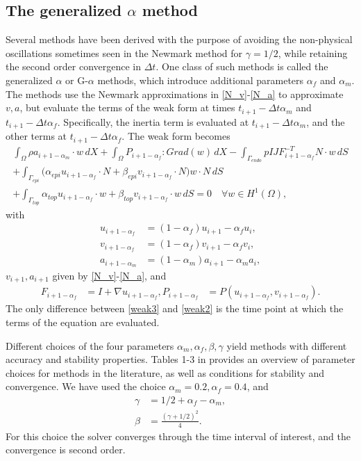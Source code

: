 \documentclass[a4paper,10pt]{article}
\begin{document}
\subsection{The generalized $\alpha$ method}
Several methods have been derived with the purpose of avoiding the non-physical
oscillations sometimes seen in the Newmark method for $\gamma =1/2$, while retaining
the second order convergence in $\Delta t$. One class of such methods is called
the generalized $\alpha$ or G-$\alpha$ methods, which introduce additional parameters
$\alpha_f$ and $\alpha_m$. The methods use the Newmark approximations in
\eqref{N_v}-\eqref{N_a} to approximate $v,a$, but evaluate the terms of the
weak form at times $t_{i+1}-\Delta t\alpha_m$ and  $t_{i+1}-\Delta t\alpha_f$.
Specifically, the inertia term is evaluated at $t_{i+1}-\Delta t\alpha_m$, and the
other terms at $t_{i+1}-\Delta t\alpha_f$. The weak form becomes
\begin{equation}
\begin{aligned}
\int_{\Omega} \rho a_{i+1-\alpha_m} \cdot w \, dX + \int_{\Omega} P_{i+1-\alpha_f}:Grad(w) \, dX -\int_{\Gamma_{endo}} p I JF_{i+1-\alpha_f}^{-T}N \cdot w \, dS  \\
+\int_{\Gamma_{epi}} \big(\alpha_{epi} u_{i+1-\alpha_f} \cdot N + \beta_{epi} v_{i+1-\alpha_f} \cdot N \big) w \cdot N \, dS  \\
+\int_{\Gamma_{top}} \alpha_{top} u_{i+1-\alpha_f} \cdot w + \beta_{top} v_{i+1-\alpha_f} \cdot w \, dS = 0 \quad \forall w \in H^1(\Omega),
\end{aligned}\label{weak3}
\end{equation}
with
\begin{align*}
  u_{i+1-\alpha_f} &= (1-\alpha_f)u_{i+1}-\alpha_f u_i, \\
  v_{i+1-\alpha_f} &= (1-\alpha_f)v_{i+1}-\alpha_f v_i, \\
  a_{i+1-\alpha_m} &= (1-\alpha_m)a_{i+1}-\alpha_m a_i,
\end{align*}
$v_{i+1},a_{i+1}$ given by \eqref{N_v}-\eqref{N_a}, and
\begin{align*}
F_{i+1-\alpha_f} &= I + \nabla u_{i+1-\alpha_f} ,
P_{i+1-\alpha_f} &= P(u_{i+1-\alpha_f}, v_{i+1-\alpha_f}).
\end{align*}
The only difference between \eqref{weak3} and \eqref{weak2} is the time point at which the
terms of the equation are evaluated.

Different choices of the four parameters $\alpha_m, \alpha_f, \beta, \gamma$ yield
methods with different accuracy and stability properties. Tables 1-3 in \cite{erlicher2002analysis}
provides an overview of parameter choices for methods in the literature,
as well as conditions for stability and convergence.
We have used the choice $\alpha_m =0.2, \alpha_f=0.4$, and
\begin{align*}
  \gamma &= 1/2 + \alpha_f-\alpha_m ,\\
  \beta &= \frac{(\gamma + 1/2)^2}{4} .
\end{align*}
For this choice the solver converges through the time interval of interest, and
the convergence is second order.
\end{document}
